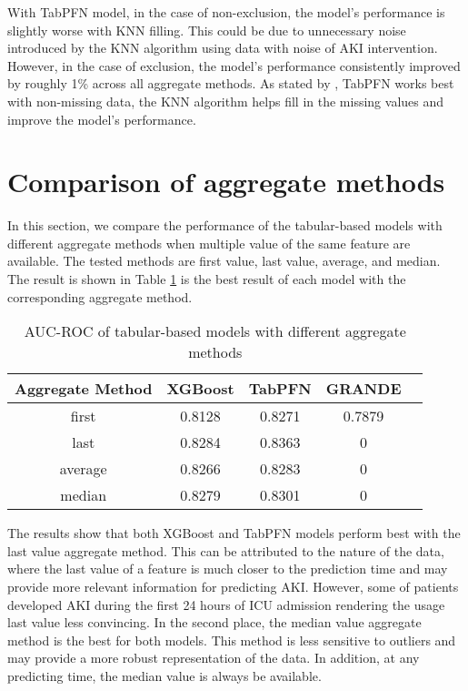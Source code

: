 \documentclass[../main.tex]{subfiles}
\begin{document}
With TabPFN model, in the case of non-exclusion, the model's performance is slightly worse with KNN filling.
This could be due to unnecessary noise introduced by the KNN algorithm using data with noise of AKI intervention.
However, in the case of exclusion, the model's performance consistently improved by roughly 1\% across all aggregate methods.
As stated by \citeauthor{tabpfn}, TabPFN works best with non-missing data, the KNN algorithm helps fill in the missing values and improve the model's performance.



\section{Comparison of aggregate methods}
\label{sec:aggregate_methods}

In this section, we compare the performance of the tabular-based models with different aggregate methods when multiple value of the same feature are available.
The tested methods are first value, last value, average, and median.
The result is shown in Table \ref{tab:aggregate_methods} is the best result of each model with the corresponding aggregate method.

\begin{table}[H]
    \centering
    \caption{AUC-ROC of tabular-based models with different aggregate methods}
    \label{tab:aggregate_methods}
    \begin{tabular}{|c|c|c|c|c|}
        \hline
        \textbf{Aggregate Method} & 
        \textbf{XGBoost} & 
        \textbf{TabPFN} & 
        \textbf{GRANDE} \\
        \hline

        first & 
        0.8128 & 
        0.8271 & 
        0.7879 \\

        last & 
        0.8284 & 
        0.8363 & 
        0 \\

        average & 
        0.8266 & 
        0.8283 & 
        0 \\

        median &
        0.8279 &
        0.8301 &
        0 \\

        \hline
    \end{tabular}
\end{table}

The results show that both XGBoost and TabPFN models perform best with the last value aggregate method.
This can be attributed to the nature of the data, where the last value of a feature is much closer to the prediction time and may provide more relevant information for predicting AKI.
However, some of patients developed AKI during the first 24 hours of ICU admission rendering the usage last value less convincing.
In the second place, the median value aggregate method is the best for both models.
This method is less sensitive to outliers and may provide a more robust representation of the data.
In addition, at any predicting time, the median value is always be available.
\end{document}
